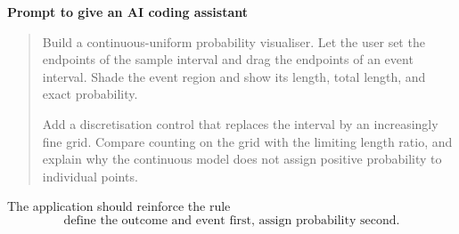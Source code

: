 \begin{examplebox}
\textbf{Prompt to give an AI coding assistant}

\begin{quote}\small
Build a continuous-uniform probability visualiser. Let the user set the endpoints of the sample interval and drag the endpoints of an event interval. Shade the event region and show its length, total length, and exact probability.

Add a discretisation control that replaces the interval by an increasingly fine grid. Compare counting on the grid with the limiting length ratio, and explain why the continuous model does not assign positive probability to individual points.
\end{quote}
\end{examplebox}

\begin{summarybox}
The application should reinforce the rule
\[
\text{define the outcome and event first, assign probability second}.
\]
\end{summarybox}
